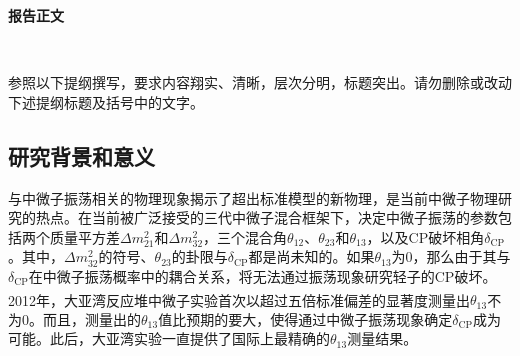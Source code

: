 \documentclass[a4paper,zihao=-4]{article}
\newcommand{\citess}[1]{\textsuperscript{\cite{#1}}}
\begin{document}
\kaishu

\setlength{\abovedisplayskip}{0pt}
\setlength{\belowdisplayskip}{0pt}

\begin{center}
	{\kaishu {} \textbf{报告正文} \vspace{-3ex}}
\end{center}  

\thispagestyle{empty} 　　　%


{\kaishu {}参照以下提纲撰写，要求内容翔实、清晰，层次分明，标题突出。}\alert{请勿删除或改动下述提纲标题及括号中的文字。\vspace{9bp}}



\subsection{研究背景和意义}
与中微子振荡相关的物理现象揭示了超出标准模型的新物理，是当前中微子物理研究的热点。在当前被广泛接受的三代中微子混合框架下，决定中微子振荡的参数包括两个质量平方差$\Delta m_{21}^2$和$\Delta m_{32}^2$，三个混合角$\theta_{12}$、$\theta_{23}$和$\theta_{13}$，以及CP破坏相角$\delta_{\text{CP}}$。其中，$\Delta m_{32}^2$的符号、$\theta_{23}$的卦限与$\delta_{\text{CP}}$都是尚未知的。如果$\theta_{13}$为0，那么由于其与$\delta_{\text{CP}}$在中微子振荡概率中的耦合关系，将无法通过振荡现象研究轻子的CP破坏。2012年，大亚湾反应堆中微子实验\citess{DayaBay:2012fng}首次以超过五倍标准偏差的显著度测量出$\theta_{13}$不为0。而且，测量出的$\theta_{13}$值比预期的要大，使得通过中微子振荡现象确定$\delta_{\text{CP}}$成为可能。此后，大亚湾实验一直提供了国际上最精确的$\theta_{13}$测量结果。
\end{document}
